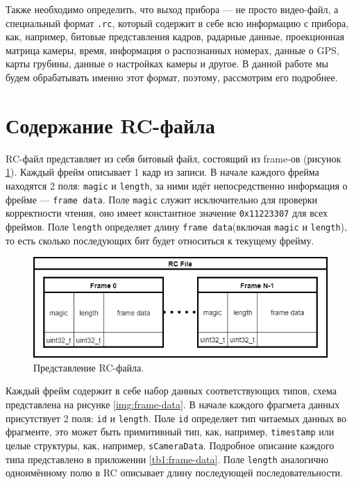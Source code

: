 \documentclass[specification,annotation,times]{itmo-student-thesis}
\begin{document}
	Также необходимо определить, что выход прибора --- не просто видео-файл, а специальный формат \texttt{.rc}, который содержит в себе всю информацию с прибора, как, например, битовые представления кадров, радарные данные, проекционная матрица камеры, время, информация о распознанных номерах, данные о GPS, карты грубины, данные о настройках камеры и другое. В данной работе мы будем обрабатывать именно этот формат, поэтому, рассмотрим его подробнее.
	
	\section{Содержание RC-файла} \label{par:rc-description}
	
	RC-файл представляет из себя битовый файл, состоящий из frame-ов (рисунок \ref{img:rc-file}). Каждый фрейм описывает 1 кадр из записи. В начале каждого фрейма находятся 2 поля: \texttt{magic} и \texttt{length}, за ними идёт непосредственно информация о фрейме --- \texttt{frame data}. Поле \texttt{magic} служит исключительно для проверки корректности чтения, оно имеет константное значение \texttt{0x11223307} для всех фреймов. Поле \texttt{length} определяет длину \texttt{frame data}(включая \texttt{magic} и \texttt{length}), то есть сколько последующих бит будет относиться к текущему фрейму.  
	
	\begin{figure}[!ht]
		\caption{Представление RC-файла.}\label{img:rc-file}
		\includegraphics[width=0.85\linewidth]{../png/rc_file.png}
		\centering
	\end{figure}
	
	Каждый фрейм содержит в себе набор данных соответствующих типов, схема представлена на рисунке \ref{img:frame-data}. В начале каждого фрагмета данных присутствует 2 поля: \texttt{id} и \texttt{length}. Поле \texttt{id} определяет тип читаемых данных во фрагменте, это может быть примитивный тип, как, например, \texttt{timestamp} или целые структуры, как, например, \texttt{sCameraData}. Подробное описание каждого типа представлено в приложении \ref{tb1:frame-data}. Поле \texttt{length} аналогично одноимённому полю в RC описывает длину последующей последовательности.
	
\end{document}
